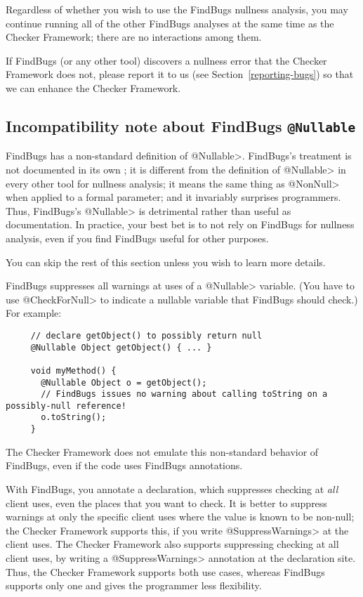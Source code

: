 Regardless of whether you wish to use the FindBugs nullness analysis, you
may continue running all of the other FindBugs analyses at the same time as
the Checker Framework; there are no interactions among them.

If FindBugs (or any other tool) discovers a nullness error that the Checker
Framework does not, please report it to us (see
Section~\ref{reporting-bugs}) so that we can enhance the Checker Framework.



\subsection{Incompatibility note about FindBugs \tt{@Nullable}\label{findbugs-nullable}}

FindBugs has a non-standard definition of \<@Nullable>.  FindBugs's treatment is not
documented in its own
;
it is different from the definition of \<@Nullable> in every other tool for
nullness analysis; it means the same thing as \<@NonNull> when applied to a
formal parameter; and it invariably surprises programmers.  Thus, FindBugs's
\<@Nullable> is detrimental rather than useful as documentation.
In practice, your best bet is to not rely on FindBugs for nullness analysis,
even if you find FindBugs useful for other purposes.

You can skip the rest of this section unless you wish to learn more details.

FindBugs suppresses all warnings at uses of a \<@Nullable> variable.
(You have to use \<@CheckForNull> to
indicate a nullable variable that FindBugs should check.)  For example:

\begin{Verbatim}
     // declare getObject() to possibly return null
     @Nullable Object getObject() { ... }

     void myMethod() {
       @Nullable Object o = getObject();
       // FindBugs issues no warning about calling toString on a possibly-null reference!
       o.toString();
     }
\end{Verbatim}

\noindent
The Checker Framework does not emulate this non-standard behavior of
FindBugs, even if the code uses FindBugs annotations.

With FindBugs, you annotate a declaration, which suppresses checking at
\emph{all} client uses, even the places that you want to check.
It is better to suppress warnings at only the specific client uses
where the value is known to be non-null; the Checker Framework supports
this, if you write \<@SuppressWarnings> at the client uses.
The Checker Framework also supports suppressing checking at all client uses,
by writing a \<@SuppressWarnings> annotation at the declaration site.
Thus, the Checker Framework supports both use cases, whereas FindBugs
supports only one and gives the programmer less flexibility.

